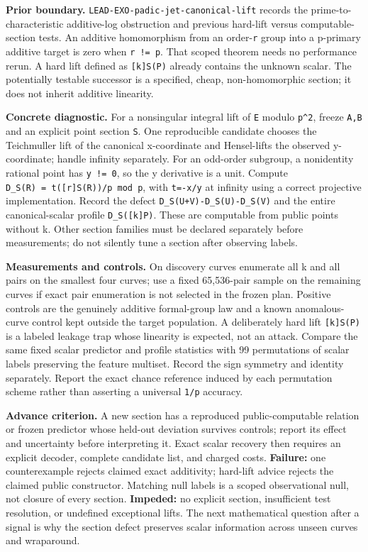 \documentclass[
  10pt,
]{article}
\begin{document}
\textbf{Prior boundary.} \texttt{LEAD-EXO-padic-jet-canonical-lift}
records the prime-to-characteristic additive-log obstruction and
previous hard-lift versus computable-section tests. An additive
homomorphism from an order-\texttt{r} group into a p-primary additive
target is zero when \texttt{r\ !=\ p}. That scoped theorem needs no
performance rerun. A hard lift defined as \texttt{{[}k{]}S(P)} already
contains the unknown scalar. The potentially testable successor is a
specified, cheap, non-homomorphic section; it does not inherit additive
linearity.

\textbf{Concrete diagnostic.} For a nonsingular integral lift of
\texttt{E} modulo \texttt{p\^{}2}, freeze \texttt{A,B} and an explicit
point section \texttt{S}. One reproducible candidate chooses the
Teichmuller lift of the canonical x-coordinate and Hensel-lifts the
observed y-coordinate; handle infinity separately. For an odd-order
subgroup, a nonidentity rational point has \texttt{y\ !=\ 0}, so the y
derivative is a unit. Compute
\texttt{D\_S(R)\ =\ t({[}r{]}S(R))/p\ mod\ p}, with \texttt{t=-x/y} at
infinity using a correct projective implementation. Record the defect
\texttt{D\_S(U+V)-D\_S(U)-D\_S(V)} and the entire canonical-scalar
profile \texttt{D\_S({[}k{]}P)}. These are computable from public points
without k. Other section families must be declared separately before
measurements; do not silently tune a section after observing labels.

\textbf{Measurements and controls.} On discovery curves enumerate all k
and all pairs on the smallest four curves; use a fixed 65,536-pair
sample on the remaining curves if exact pair enumeration is not selected
in the frozen plan. Positive controls are the genuinely additive
formal-group law and a known anomalous-curve control kept outside the
target population. A deliberately hard lift \texttt{{[}k{]}S(P)} is a
labeled leakage trap whose linearity is expected, not an attack. Compare
the same fixed scalar predictor and profile statistics with 99
permutations of scalar labels preserving the feature multiset. Record
the sign symmetry and identity separately. Report the exact chance
reference induced by each permutation scheme rather than asserting a
universal \texttt{1/p} accuracy.

\textbf{Advance criterion.} A new section has a reproduced
public-computable relation or frozen predictor whose held-out deviation
survives controls; report its effect and uncertainty before interpreting
it. Exact scalar recovery then requires an explicit decoder, complete
candidate list, and charged costs. \textbf{Failure:} one counterexample
rejects claimed exact additivity; hard-lift advice rejects the claimed
public constructor. Matching null labels is a scoped observational null,
not closure of every section. \textbf{Impeded:} no explicit section,
insufficient test resolution, or undefined exceptional lifts. The next
mathematical question after a signal is why the section defect preserves
scalar information across unseen curves and wraparound.
\end{document}
